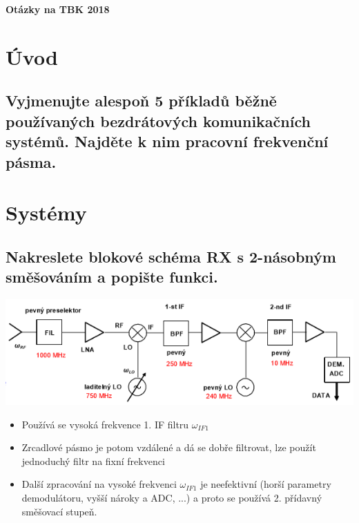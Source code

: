 \documentclass[a4paper]{article}
\begin{document}
\textbf{\Large{Otázky na TBK 2018}}
\newpage
\section{Úvod}
\subsection{\textbf{Vyjmenujte alespoň 5 příkladů běžně používaných bezdrátových komunikačních systémů. Najděte k nim pracovní frekvenční pásma.}}

\section{Systémy}
\subsection{\textbf{Nakreslete blokové schéma RX s 2-násobným směšováním a popište funkci.}}
\includegraphics{images/rx_2_nasobny.png}
\begin{itemize}
	\item Používá se vysoká frekvence 1. IF filtru $\omega_{IF1}$
	\item Zrcadlové pásmo je potom vzdálené a dá se dobře filtrovat, lze použít jednoduchý filtr na fixní frekvenci
	\item Další zpracování na vysoké frekvenci $\omega_{IF1}$ je neefektivní (horší parametry demodulátoru, vyšší nároky a ADC, ...) a proto se používá 2. přídavný směšovací stupeň.
\end{itemize}
\end{document}
